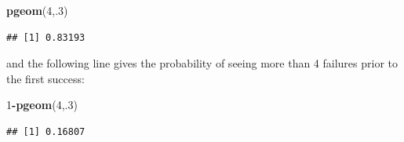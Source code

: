\documentclass[
]{book}
\newenvironment{Shaded}{\begin{snugshade}}{\end{snugshade}}
\newcommand{\DecValTok}[1]{\textcolor[rgb]{0.00,0.00,0.81}{#1}}
\newcommand{\FunctionTok}[1]{\textcolor[rgb]{0.13,0.29,0.53}{\textbf{#1}}}
\newcommand{\NormalTok}[1]{#1}
\newcommand{\SpecialCharTok}[1]{\textcolor[rgb]{0.81,0.36,0.00}{\textbf{#1}}}
\theoremstyle{definition}
\theoremstyle{definition}
\theoremstyle{definition}
\theoremstyle{definition}
\theoremstyle{remark}
\begin{document}
\begin{Shaded}
\begin{Highlighting}[]
\FunctionTok{pgeom}\NormalTok{(}\DecValTok{4}\NormalTok{,.}\DecValTok{3}\NormalTok{)}
\end{Highlighting}
\end{Shaded}

\begin{verbatim}
## [1] 0.83193
\end{verbatim}

and the following line gives the probability of seeing more than 4 failures prior to the first success:

\begin{Shaded}
\begin{Highlighting}[]
\DecValTok{1}\SpecialCharTok{{-}}\FunctionTok{pgeom}\NormalTok{(}\DecValTok{4}\NormalTok{,.}\DecValTok{3}\NormalTok{)}
\end{Highlighting}
\end{Shaded}

\begin{verbatim}
## [1] 0.16807
\end{verbatim}
\end{document}
